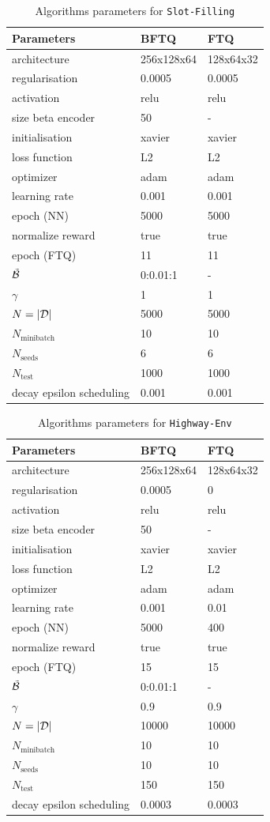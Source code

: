 \begin{table}[tp]
    \centering
    \begin{tabular}{lll}
        \toprule
        Parameters & BFTQ & FTQ\tabularnewline
        \midrule
        architecture & 256x128x64 & 128x64x32\tabularnewline
        regularisation & 0.0005 & 0.0005\tabularnewline
        activation & relu & relu\tabularnewline
        size beta encoder & 50 & -\tabularnewline
        initialisation & xavier & xavier\tabularnewline
        loss function & L2 & L2\tabularnewline
        optimizer & adam & adam\tabularnewline
        learning rate & 0.001 & 0.001\tabularnewline
        epoch (NN) & 5000 & 5000\tabularnewline
        normalize reward & true & true\tabularnewline
        epoch (FTQ) & 11 & 11\tabularnewline
        $\tilde{\mathcal{B}}$ & 0:0.01:1 & -\tabularnewline
        $\gamma$ & 1 & 1\tabularnewline
        $N=|\mathcal{D}|$ & 5000 & 5000\tabularnewline
        $N_\text{minibatch}$ & 10 & 10\tabularnewline
        $N_\text{seeds}$ & 6 & 6\tabularnewline
        $N_\text{test}$ & 1000 & 1000\tabularnewline
        decay epsilon scheduling & 0.001 & 0.001\tabularnewline
        \bottomrule
    \end{tabular}
    \caption{Algorithms parameters for \texttt{Slot-Filling}}
    \label{tab:param-algo-slot-filling}
\end{table}
\begin{table}[tp]
    \centering
    \begin{tabular}{lll}
        \toprule
        Parameters & BFTQ & FTQ\tabularnewline
        \midrule
        architecture & 256x128x64 & 128x64x32\tabularnewline
        regularisation & 0.0005 & 0\tabularnewline
        activation & relu & relu\tabularnewline
        size beta encoder & 50 & -\tabularnewline
        initialisation & xavier & xavier\tabularnewline
        loss function & L2 & L2\tabularnewline
        optimizer & adam & adam\tabularnewline
        learning rate & 0.001 & 0.01\tabularnewline
        epoch (NN) & 5000 & 400\tabularnewline
        normalize reward & true & true\tabularnewline
        epoch (FTQ) & 15 & 15\tabularnewline
        $\tilde{\mathcal{B}}$ & 0:0.01:1 & -\tabularnewline
        $\gamma$ & 0.9 & 0.9\tabularnewline
        $N=|\mathcal{D}|$ & 10000 & 10000\tabularnewline
        $N_\text{minibatch}$ & 10 & 10\tabularnewline
        $N_\text{seeds}$ & 10 & 10\tabularnewline
        $N_\text{test}$ & 150 & 150\tabularnewline
        decay epsilon scheduling & 0.0003 & 0.0003\tabularnewline
        \bottomrule
    \end{tabular}
    \caption{Algorithms parameters for \texttt{Highway-Env}}
    \label{tab:param-algo-highway-env}
\end{table}

